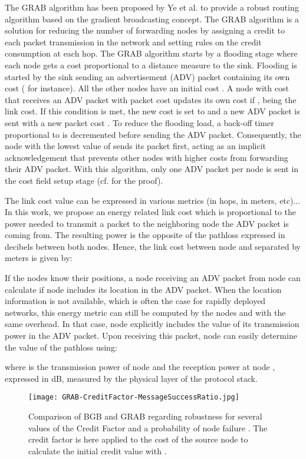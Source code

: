 \documentclass[journal, peerreview, onecolumn, draftcls]{IEEEtran}
\begin{document}
The GRAB algorithm has been proposed by Ye et al. \cite{GRAB01, GRAB05} to provide a robust routing algorithm based on the gradient broadcasting concept. The GRAB algorithm is a solution for reducing the number of forwarding nodes by assigning a credit to each packet transmission in the network and setting rules on the credit consumption at each hop.
The GRAB algorithm \cite{GRAB05} starts by a flooding stage where each node gets a cost proportional to a distance measure to the sink. Flooding is started by the sink sending an advertisement (ADV) packet containing its own cost ( for instance). All the other nodes have an initial cost . A node  with cost  that receives an ADV packet with packet cost  updates its own cost if ,  being the link cost. If this condition is met, the new cost  is set to  and a new ADV packet is sent with a new packet cost . To reduce the flooding load, a back-off timer proportional to  is decremented before sending the ADV packet. Consequently, the node with the lowest value of  sends its packet first, acting as an implicit acknowledgement that prevents other nodes with higher costs from forwarding their ADV packet. With this algorithm, only one ADV packet per node is sent in the cost field setup stage (cf. \cite{GRAB01} for the proof).

The link cost value can be expressed in various metrics (in hops, in meters, etc)... In this work, we propose an energy related link cost which is proportional to the power needed to transmit a packet to the neighboring node the ADV packet is coming from. The resulting power is the opposite of the pathloss expressed in decibels between both nodes. Hence, the link cost between node  and  separated by  meters is given by:


If the nodes know their positions, a node  receiving an ADV packet from node  can calculate  if node  includes its location in the ADV packet.
When the location information is not available, which is often the case for rapidly deployed networks, this energy metric can still be computed by the nodes and with the same overhead. In that case, node  explicitly includes the value of its transmission power in the ADV packet. Upon receiving this packet, node  can easily determine the value of the pathloss using:

\noindent where  is the transmission power of node  and  the reception power at node , expressed in dB, measured by the physical layer of the protocol stack.

\begin{figure}
    \centering
  \texttt{[image: GRAB-CreditFactor-MessageSuccessRatio.jpg]}
    \caption{Comparison of BGB and GRAB regarding robustness for several values of the Credit Factor  and a probability of node failure . The credit factor  is here applied to the cost of the source node  to calculate the initial credit value  with .}
    \label{fig:Grab-BGrab-Rob}
\end{figure}
\end{document}
